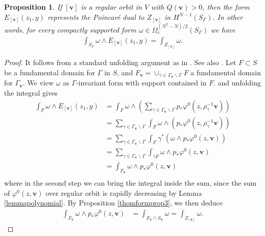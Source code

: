 \documentclass[a4paper,11pt]{amsart} %
\newcommand{\8}{\infty}
\newcommand{\vbf}{\mathbf{v}}
\theoremstyle{mytheoremstyle}
\newtheorem{prop}[thm]{Proposition}
\theoremstyle{remark}
\numberwithin{equation}{section}
\begin{document}
\begin{prop} \label{fouriercoeffn} If $[\vbf]$ is a regular orbit in $V$ with $Q(\vbf)>0$, then the form $E_{[\vbf]}(z_1,y)$ represents the Poincaré dual to $Z_{[\vbf]}$ in $H^{N-1}(S_\Gamma)$. In other words, for every compactly supported form $\omega \in \Omega_c^{(N^2-N)/2}(S_\Gamma)$ we have
\begin{align}
   \int_{S_\Gamma} \omega \wedge E_{[\vbf]}(z_1,y)=\int_{Z_{[\vbf]}} \omega.
\end{align}
\end{prop}

\begin{proof} It follows from a standard unfolding argument as in \cite{kmcjm}. See also \cite[Lemma.~2.1]{KM82}. Let $F \subset S$ be a fundamental domain for $\Gamma$ in $S$, and $F_\vbf=\cup_{\gamma \in \Gamma_\vbf \backslash \Gamma} F$ a fundamental domain for $\Gamma_\vbf$. We view $\omega$ as $\Gamma$-invariant form with support contained in $F$. 
 and unfolding the integral gives
\begin{align}
\int_{F} \omega \wedge E_{[\vbf]}(z_1,y) & = \int_{F} \omega \wedge \left ( \sum_{\gamma \in \Gamma_\vbf \backslash \Gamma} p_\ast \varphi^0(z,\rho_{\gamma}^{-1}\vbf) \right ) \\
&= \sum_{\gamma \in \Gamma_\vbf \backslash \Gamma}  \int_{F} \omega \wedge \left ( p_\ast \varphi^0(z,\rho_{\gamma}^{-1}\vbf) \right ) \\
& = \sum_{\gamma \in \Gamma_\vbf \backslash \Gamma}  \int_{F}  \gamma^\ast \left ( \omega \wedge p_\ast \varphi^0(z,\vbf) \right ) \\
 & = \sum_{\gamma \in \Gamma_\vbf \backslash \Gamma} \int_{\gamma F} \omega \wedge p_\ast \varphi^0(z,\vbf) \\
& = \int_{F_\vbf} \omega \wedge p_\ast \varphi^0(z,\vbf) \\
\end{align}
where in the second step we can bring the integral inside the sum, since the sum of $\varphi^0(z,\vbf)$ over regular orbit is rapidly decreasing by Lemma \ref{lemmapolynomial}. By Proposition \ref{thomformprop3},  we then deduce
\begin{align}
 \int_{F_\vbf} \omega \wedge p_\ast \varphi^0(z,\vbf) & = \int_{F_\vbf \cap S_\vbf} \omega = \int_{Z_{[\vbf]}} \omega.
\end{align}


\end{proof}
\end{document}
